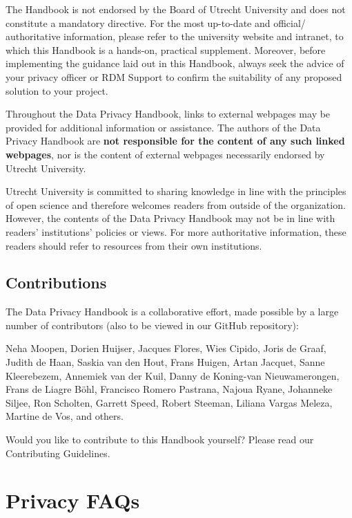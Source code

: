 \documentclass[
]{book}
\begin{document}
The Handbook is not endorsed by the Board of Utrecht University and does not
constitute a mandatory directive. For the most up-to-date and official/
authoritative information, please refer to the
university
website and intranet,
to which this Handbook is a hands-on, practical supplement. Moreover, before
implementing the guidance laid out in this Handbook, always seek the advice of
your privacy officer or RDM Support to confirm the suitability of any proposed
solution to your project.

Throughout the Data Privacy Handbook, links to external webpages may be provided
for additional information or assistance. The authors of the Data Privacy
Handbook are \textbf{not responsible for the content of any such linked webpages}, nor
is the content of external webpages necessarily endorsed by Utrecht University.

Utrecht University is committed to sharing knowledge in line with the principles
of open science and therefore welcomes readers from outside of the organization.
However, the contents of the Data Privacy Handbook may not be in line with readers'
institutions' policies or views. For more authoritative information, these
readers should refer to resources from their own institutions.

\hypertarget{contributions}{%
\section{Contributions}\label{contributions}}

The Data Privacy Handbook is a collaborative effort, made possible by a large
number of contributors (also to be viewed in our
GitHub repository):

Neha Moopen, Dorien Huijser, Jacques Flores, Wies Cipido, Joris de Graaf,
Judith de Haan, Saskia van den Hout, Frans Huigen, Artan Jacquet, Sanne Kleerebezem,
Annemiek van der Kuil, Danny de Koning-van Nieuwamerongen, Frans de Liagre Böhl,
Francisco Romero Pastrana, Najoua Ryane, Johanneke Siljee, Ron Scholten,
Garrett Speed, Robert Steeman, Liliana Vargas Meleza, Martine de Vos, and others.

Would you like to contribute to this Handbook yourself? Please read our
Contributing Guidelines.

\hypertarget{faq}{%
\chapter{Privacy FAQs}\label{faq}}
\end{document}
